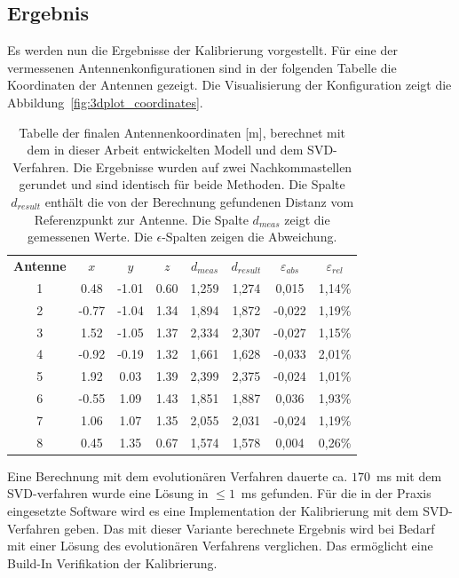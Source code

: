 %
\subsection{Ergebnis}
Es werden nun die Ergebnisse der Kalibrierung vorgestellt. Für eine der vermessenen Antennenkonfigurationen sind in der folgenden Tabelle die Koordinaten der Antennen gezeigt. Die Visualisierung der Konfiguration zeigt die Abbildung~\ref{fig:3dplot_coordinates}.
%
\begin{table} [ht!]
	\begin{center}
		\begin{tabular}{cccccccc}
		      \textbf{Antenne} & \textbf{$x$} & \textbf{$y$} & \textbf{$z$} & \textbf{$d_{meas}$} & \textbf{$d_{result}$}& \textbf{$\varepsilon_{abs}$} & \textbf{$\varepsilon_{rel}$} \\
		      1 & 0.48		& -1.01	& 0.60 & 1,259 & 1,274& 0,015 & 1,14\% \\
		      2 & -0.77 	& -1.04 	& 1.34 & 1,894 & 1,872 & -0,022 & 1,19\% \\
		      3 & 1.52  	& -1.05 	& 1.37 & 2,334 & 2,307 & -0,027 & 1,15\% \\
		      4 & -0.92 	& -0.19 	& 1.32 & 1,661 & 1,628 & -0,033 & 2,01\% \\
		      5 & 1.92 		&  0.03 	& 1.39 & 2,399 & 2,375 & -0,024 & 1,01\% \\
		      6 & -0.55 	&  1.09 	& 1.43 & 1,851 & 1,887 & 0,036 & 1,93\% \\
		      7 & 1.06 		&  1.07 	& 1.35 & 2,055 & 2,031 & -0,024 & 1,19\% \\
		      8 & 0.45 		&  1.35 	& 0.67 & 1,574 & 1,578 & 0,004 & 0,26\% \\					
%
		\end{tabular}
		\caption[Finale Antennen Koordinaten]{Tabelle der finalen Antennenkoordinaten [m], berechnet mit dem in dieser Arbeit entwickelten Modell und dem SVD-Verfahren. Die Ergebnisse wurden auf zwei Nachkommastellen gerundet und sind identisch für beide Methoden. Die Spalte $d_{result}$ enthält die von der Berechnung gefundenen Distanz vom Referenzpunkt zur Antenne. Die Spalte $d_{meas}$ zeigt die gemessenen Werte. Die $\epsilon$-Spalten zeigen die Abweichung.}
		\label{tab:FinalCoords}
	\end{center}
\end{table}
%
Eine Berechnung mit dem evolutionären Verfahren dauerte ca. $170$~ms mit dem SVD-verfahren wurde eine Lösung in $\le 1$~ms gefunden. Für die in der Praxis eingesetzte Software wird es eine Implementation der Kalibrierung mit dem SVD-Verfahren geben. Das mit dieser Variante berechnete Ergebnis wird bei Bedarf mit einer Lösung des evolutionären Verfahrens verglichen. Das ermöglicht eine Build-In Verifikation der Kalibrierung.\\

